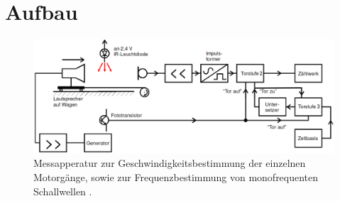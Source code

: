 \section{Aufbau}
\label{sec:Aufbau}
\begin{figure}[H]
         \centering
         \includegraphics[width=\linewidth-50pt,height=\textheight-50pt,keepaspectratio]{content/Bilder/steve.png}
         \caption{Messapperatur zur Geschwindigkeitsbestimmung der einzelnen Motorgänge, sowie zur Frequenzbestimmung von monofrequenten Schallwellen \cite{V104}.}
         \label{fig:Aufbau}
       \end{figure}

